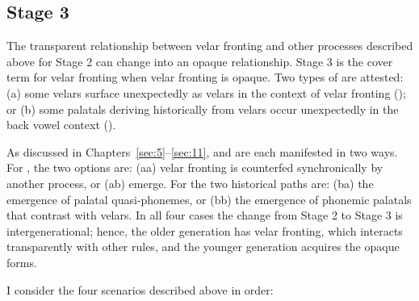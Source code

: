 \subsection{Stage 3}
\begin{sloppypar}
The transparent relationship between velar fronting and other processes described above for Stage 2 can change into an opaque relationship. Stage 3 is the cover term for velar fronting when velar fronting is opaque. Two types of  are attested: (a) some velars surface unexpectedly as velars in the context of velar fronting (); or (b) some palatals deriving historically from velars occur unexpectedly in the back vowel context ().
\end{sloppypar}

As discussed in Chapters~\ref{sec:5}–\ref{sec:11},  and  are each manifested in two ways. For , the two options are: (aa) velar fronting is counterfed synchronically by another process, or (ab)  emerge. For  the two historical paths are: (ba) the emergence of palatal quasi-phonemes, or (bb) the emergence of phonemic palatals that contrast with velars. In all four cases the change from Stage 2 to Stage 3 is intergenerational; hence, the older generation has velar fronting, which interacts transparently with other rules, and the younger generation acquires the opaque forms.

I consider the four scenarios described above in order:

